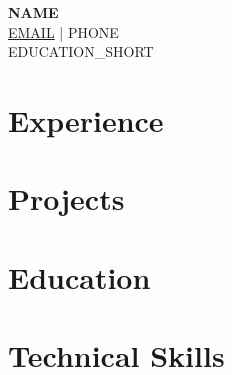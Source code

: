 \documentclass[a4paper,10pt]{article}
\newcommand{\entry}[4]{
  \noindent \textbf{#1} \hfill #2 \\
  \textit{#3} \hfill #4
}
\newcommand{\project}[3]{
  \noindent \textbf{#1} | \textit{#2} \hfill #3
}
\begin{document}
\pagestyle{empty}

\begin{center}
    {\Huge \textbf{NAME}} \\
    \vspace{2mm}
    \href{mailto:EMAIL}{EMAIL} | PHONE \\
    EDUCATION\_SHORT
\end{center}

\vspace{-4mm}

\section{Experience}


\section{Projects}


\section{Education}

\section{Technical Skills}
\end{document}
